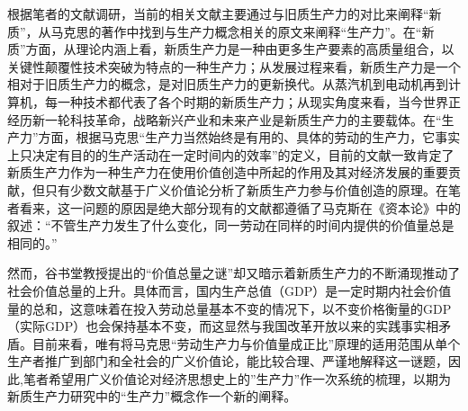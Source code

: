 根据笔者的文献调研，当前的相关文献主要通过与旧质生产力的对比来阐释“新质”，从马克思的著作中找到与生产力概念相关的原文来阐释“生产力”。在“新质”方面，从理论内涵上看，新质生产力是一种由更多生产要素的高质量组合，以关键性颠覆性技术突破为特点的一种生产力\cite[141-142]{GaoFanXinZhiShengChanLiDeTiChuLuoJiDuoWeiNeiHanJiShiDaiYiYi2023}\cite[1-2]{ZhouWenLunXinZhiShengChanLiNeiHanTeZhengYuChongYaoZhaoLiDian2023}；从发展过程来看，新质生产力是一个相对于旧质生产力的概念，是对旧质生产力的更新换代。从蒸汽机到电动机再到计算机，每一种技术都代表了各个时期的新质生产力\cite[28]{CaiJiMingXinZhiShengChanLiDeFaZhanDuiJieZhiChuangZaoHeJingJiZengChangDeGongXian2024}；从现实角度来看，当今世界正经历新一轮科技革命\cite[06]{XiJinPingJiaKuaiJianSheKeJiQiangGuoShiXianGaoShuiPingKeJiZiLiZiQiang2022}，战略新兴产业和未来产业是新质生产力的主要载体\cite[9]{XiJinPingJingJiSiXiangYanJiuZhongXinXinZhiShengChanLiDeNeiHanTeZhengHeFaZhanChongDian2024}。在“生产力”方面，根据马克思“生产力当然始终是有用的、具体的劳动的生产力，它事实上只决定有目的的生产活动在一定时间内的效率”\cite[59]{ZhongGongZhongYangMaKeSiEnGeSiLieNingSiDaLinZhuZuoBianYiJuMaKeSiEnGeSiWenJiDi5Juan2009}的定义，目前的文献一致肯定了新质生产力作为一种生产力在使用价值创造中所起的作用及其对经济发展的重要贡献\cite[16]{CaiJiMingXinZhiShengChanLiCanYuJieZhiChuangZaoDeLiLunTanTaoHeShiJianYingYong2024}\cite{YangYuZhenXinZhiShengChanLiLiLunDuiMaKeSiShengChanLiShengChanGuanXiLiLunDeShouZhengHeChuangXin2025}\cite{XieFuShengMaKeSiDeShengChanLiLiLunYuFaZhanXinZhiShengChanLi2024}\cite{HuYingZaiLunXinZhiShengChanLiDeNeiHanTeZhengYuXingChengLuJingYiMaKeSiShengChanLiLiLunWeiShiJiao2024}，但只有少数文献基于广义价值论分析了新质生产力参与价值创造的原理\cite{CaiJiMingXinZhiShengChanLiDeFaZhanDuiJieZhiChuangZaoHeJingJiZengChangDeGongXian2024}\cite{CaiJiMingXinZhiShengChanLiCanYuJieZhiChuangZaoDeLiLunTanTaoHeShiJianYingYong2024}。在笔者看来，这一问题的原因是绝大部分现有的文献都遵循了马克斯在《资本论》中的叙述：“不管生产力发生了什么变化，同一劳动在同样的时间内提供的价值量总是相同的。”\cite[60]{ZhongGongZhongYangMaKeSiEnGeSiLieNingSiDaLinZhuZuoBianYiJuMaKeSiEnGeSiWenJiDi5Juan2009}

然而，谷书堂教授提出的“价值总量之谜”\cite[6-7]{GuShuTangQiuJieJieZhiZongLiangZhiMiLiangTiaoSiLuDeBiJiao2002}却又暗示着新质生产力的不断涌现推动了社会价值总量的上升。具体而言，国内生产总值（GDP）是一定时期内社会价值量的总和\cite[107]{ChenDeDiGuoFangJingJiDaCiDian2001}\cite[659]{BaoLuo*SaMouErSenJingJiXueDiShiJiuBan2012}，这意味着在投入劳动总量基本不变的情况下，以不变价格衡量的GDP（实际GDP）也会保持基本不变，而这显然与我国改革开放以来的实践事实相矛盾。目前来看，唯有将马克思“劳动生产力与价值量成正比”原理的适用范围从单个生产者推广到部门和全社会的广义价值论，能比较合理、严谨地解释这一谜题\cite{CaiJiMingJiShuJinBuJingJiZengChangYuJieZhiZongLiangZhiMiJiYuGuangYiJieZhiLunDeJieShi2019}，因此,笔者希望用广义价值论对经济思想史上的”生产力”作一次系统的梳理，以期为新质生产力研究中的“生产力”概念作一个新的阐释。

